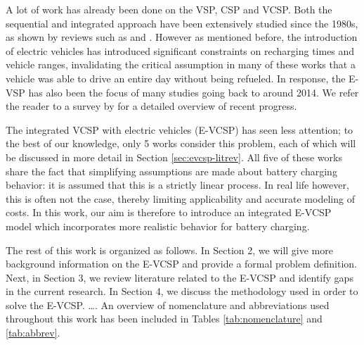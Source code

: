 \documentclass[]{article}
\begin{document}
A lot of work has already been done on the VSP, CSP and VCSP. Both the sequential and integrated approach have been extensively studied since the 1980s, as shown by reviews such as \citet{Ibarra-Rojas2015} and \citet{Ge2024}. However as mentioned before, the introduction of electric vehicles has introduced significant constraints on recharging times and vehicle ranges, invalidating the critical assumption in many of these works that a vehicle was able to drive an entire day without being refueled. In response, the E-VSP has also been the focus of many studies going back to around 2014. We refer the reader to a survey by \citet{Perumal2022LitRev} for a detailed overview of recent progress.

 The integrated VCSP with electric vehicles (E-VCSP) has seen less attention; to the best of our knowledge, only 5 works consider this problem, each of which will be discussed in more detail in Section \ref{sec:evcsp-litrev}. All five of these works share the fact that simplifying assumptions are made about battery charging behavior: it is assumed that this is a strictly linear process. In real life however, this is often not the case, thereby limiting applicability and accurate modeling of costs. In this work, our aim is therefore to introduce an integrated E-VCSP model which incorporates more realistic behavior for battery charging.

The rest of this work is organized as follows. In Section 2, we will give more background information on the E-VCSP and provide a formal problem definition. Next, in Section 3, we review literature related to the E-VCSP and identify gaps in the current research. In Section 4, we discuss the methodology used in order to solve the E-VCSP. \dots. An overview of nomenclature and abbreviations used throughout this work has been included in Tables \ref{tab:nomenclature} and \ref{tab:abbrev}.
\end{document}
